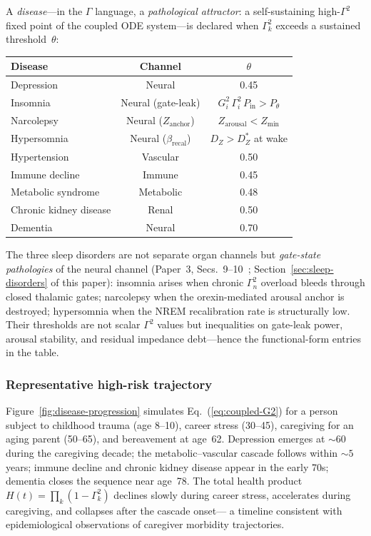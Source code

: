 \documentclass[aps,pre,twocolumn,superscriptaddress,floatfix]{revtex4-2}
\begin{document}
A \emph{disease}---in the $\Gamma$ language,
a \emph{pathological attractor}: a self-sustaining
high-$\Gamma^2$ fixed point of the coupled ODE
system---is declared when $\Gamma_k^2$ exceeds a
sustained threshold~$\theta$:
\begin{center}
\begin{tabular}{lcc}
\toprule
Disease & Channel & $\theta$ \\
\midrule
Depression & Neural & 0.45 \\
Insomnia & Neural (gate-leak) & $G_i^2\,\Gamma_i^2\,P_{\text{in}} > P_\theta$ \\
Narcolepsy & Neural ($Z_{\text{anchor}}$) & $Z_{\text{arousal}} < Z_{\min}$ \\
Hypersomnia & Neural ($\beta_{\text{recal}}$) & $D_Z > D_Z^*$ at wake \\
Hypertension & Vascular & 0.50 \\
Immune decline & Immune & 0.45 \\
Metabolic syndrome & Metabolic & 0.48 \\
Chronic kidney disease & Renal & 0.50 \\
Dementia & Neural & 0.70 \\
\bottomrule
\end{tabular}
\end{center}

\noindent
The three sleep disorders are not separate organ channels
but \emph{gate-state pathologies} of the neural channel
(Paper~3, Secs.~9--10~\cite{Paper3};
Section~\ref{sec:sleep-disorders} of this paper):
insomnia arises when chronic $\Gamma_n^2$ overload
bleeds through closed thalamic gates;
narcolepsy when the orexin-mediated arousal anchor is
destroyed;
hypersomnia when the NREM recalibration rate is
structurally low.
Their thresholds are not scalar $\Gamma^2$ values but
inequalities on gate-leak power, arousal stability, and
residual impedance debt---hence the functional-form
entries in the table.

\subsubsection{Representative high-risk trajectory}

Figure~\ref{fig:disease-progression} simulates
Eq.~(\ref{eq:coupled-G2}) for a person subject to
childhood trauma (age 8--10), career stress (30--45),
caregiving for an aging parent (50--65), and
bereavement at age~62.
Depression emerges at ${\sim}60$ during the caregiving
decade; the metabolic--vascular cascade follows
within ${\sim}5$ years;
immune decline and chronic kidney disease appear in
the early 70s; dementia closes the sequence near
age~78.
The total health product
$H(t) = \prod_k(1-\Gamma_k^2)$ declines
slowly during career stress, accelerates during
caregiving, and collapses after the cascade onset---
a timeline consistent with epidemiological
observations of caregiver morbidity trajectories.
\end{document}
